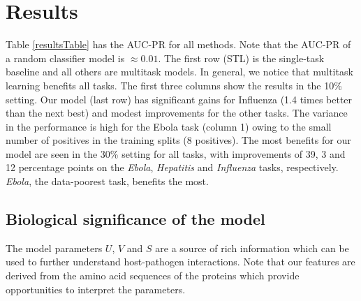 \documentclass[runningheads,a4paper]{llncs}
\begin{document}
\section{Results}
Table \ref{resultsTable} has the AUC-PR for all methods. 
Note that the AUC-PR of a random classifier model is $\approx 0.01$.
The first row (STL) is the single-task baseline and all others are multitask models. In general, we notice that multitask learning benefits
all tasks. The first three columns show the results in the 10\% setting. 
Our model (last row) has significant gains for Influenza (1.4 times better than the next best) and modest improvements for the other tasks.
The variance in the performance is high for the Ebola task (column 1) owing to the small number of positives 
in the training splits (8 positives).
The most benefits for our model are seen in the 30\% setting for all tasks, with 
improvements of 39, 3 and 12 percentage points on the \textit{Ebola}, \textit{Hepatitis} and \textit{Influenza} tasks, respectively. \textit{Ebola}, the data-poorest task, benefits the most.




\subsection{Biological significance of the model}
\label{bioanalysis}
The model parameters $U$, $V$ and $S$ are a source of rich information which can be used to further understand host-pathogen
interactions. Note that our features are derived from the amino acid sequences of the proteins which provide
opportunities to interpret the parameters.
\end{document}

